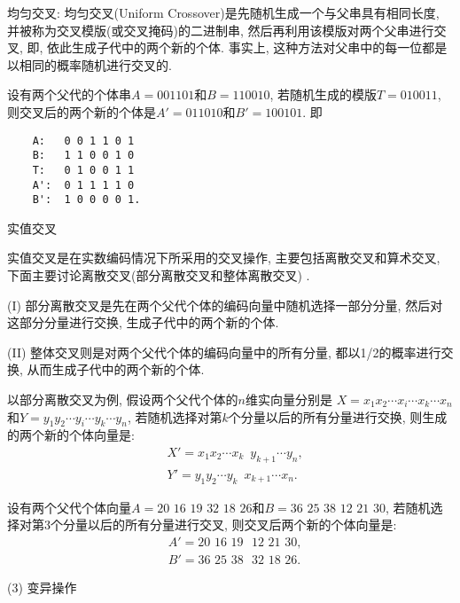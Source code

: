  均匀交叉: 均匀交叉(Uniform Crossover)是先随机生成一个与父串具有相同长度, 并被称为交叉模版(或交叉掩码)的二进制串, 然后再利用该模版对两个父串进行交叉, 即, 依此生成子代中的两个新的个体.
事实上, 这种方法对父串中的每一位都是以相同的概率随机进行交叉的.


设有两个父代的个体串$A=001101$和$B=110010$, 若随机生成的模版$T=010011$, 则交叉后的两个新的个体是$A'=011010$和$B'=100101$. 即
\begin{center}
\begin{Verbatim}
    A:   0 0 1 1 0 1
    B:   1 1 0 0 1 0
    T:   0 1 0 0 1 1
    A':  0 1 1 1 1 0
    B':  1 0 0 0 0 1.
\end{Verbatim}
\end{center}

     实值交叉

实值交叉是在实数编码情况下所采用的交叉操作, 主要包括离散交叉和算术交叉, 下面主要讨论离散交叉(部分离散交叉和整体离散交叉) .

(I) 部分离散交叉是先在两个父代个体的编码向量中随机选择一部分分量, 然后对这部分分量进行交换, 生成子代中的两个新的个体.

(II) 整体交叉则是对两个父代个体的编码向量中的所有分量, 都以1/2的概率进行交换, 从而生成子代中的两个新的个体.


\begin{example}
以部分离散交叉为例, 假设两个父代个体的$n$维实向量分别是 $X=x_1x_2\cdots x_i\cdots x_k\cdots x_n$和$Y=y_1 y_2\cdots y_i \cdots y_k \cdots y_n$, 若随机选择对第$k$个分量以后的所有分量进行交换, 则生成的两个新的个体向量是:
\begin{align*}
  &X'= x_1 x_2 \cdots x_k\,\,\, y_{k+1} \cdots y_n,\\
  &Y'= y_1 y_2 \cdots y_k\,\,\, x_{k+1} \cdots x_n.
\end{align*}

设有两个父代个体向量$A=20\,\,  16\,\,  19\,\,  32 \,\, 18 \,\, 26$和$B=36\,\,  25\,\,  38\,\,  12\,\,  21\,\,  30$, 若随机选择对第3个分量以后的所有分量进行交叉, 则交叉后两个新的个体向量是:
\begin{align*}
  &A'= 20\,\, 16\,\,  19\,\,\,\,  12\,\,  21\,\,  30,\\
  &B'= 36\,\,  25\,\,  38\,\,\,\,  32\,\,  18\,\,  26.
\end{align*}
\vspace{-0.4cm}
\end{example}

 (3) 变异操作

